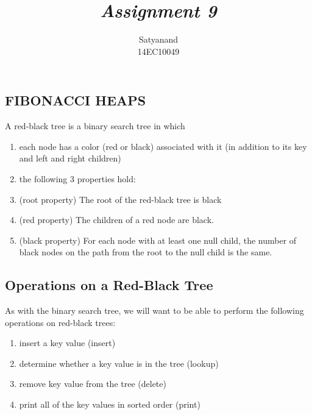 \documentclass[12pt]{article}
\title{{\it Assignment 9\/} }
\author
{Satyanand\\
14EC10049
}
\date{}
\begin{document}
 
\maketitle



\subsection*{FIBONACCI HEAPS} 
A red-black tree is a binary search tree in which
\begin{enumerate}
	\item each node has a color (red or black) associated with it (in addition to its key and left and right children)
	\item the following 3 properties hold:
	\item (root property) The root of the red-black tree is black
	\item (red property) The children of a red node are black.
	\item (black property) For each node with at least one null child, the number of black nodes on the path from the root to the null child is the same.
\end{enumerate}
\subsection*{Operations on a Red-Black Tree}

As with the binary search tree, we will want to be able to perform the following operations on red-black trees:
\begin{enumerate}
	\item insert a key value (insert)
	\item determine whether a key value is in the tree (lookup)
	\item remove key value from the tree (delete)
	\item print all of the key values in sorted order (print)
\end{enumerate}

\end{document}
